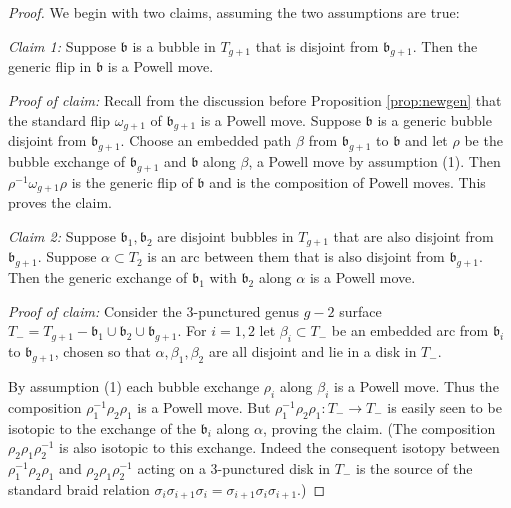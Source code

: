 \documentclass[12pt]{amsart}
\newcommand{\calG}{\mathcal G}
\newcommand{\frb}{\mathfrak{b}}
\begin{document}
\begin{proof}  We begin with two claims, assuming the two                             assumptions are true:
\medskip

{\em Claim 1:}  Suppose $\frb$ is a bubble in $T_{g+1}$ that is disjoint from $\frb_{g+1}$.  Then the generic flip in $\frb$ is a Powell move.  

{\em Proof of claim:}  Recall from the discussion before Proposition \ref{prop:newgen} that  the standard flip $\omega_{g+1}$ of $\frb_{g+1}$ is a Powell move.  Suppose $\frb$ is a generic bubble disjoint from $\frb_{g+1}$.  Choose an embedded path $\beta$ from $\frb_{g+1}$ to $\frb$ and let $\rho$ be the bubble exchange of $\frb_{g+1}$ and $\frb$ along $\beta$, a Powell move by assumption (1).  Then $\rho^{-1} \omega_{g+1} \rho$ is the generic flip of $\frb$ and is the composition of Powell moves. This proves the claim.
\medskip 

{\em Claim 2:}  Suppose $\frb_1, \frb_2$ are disjoint bubbles in $T_{g+1}$ that are also disjoint from $\frb_{g+1}$.  Suppose $\alpha \subset T_2$ is an arc between them that is also disjoint from $\frb_{g+1}$.  Then the generic exchange of $\frb_1$ with $\frb_2$ along $\alpha$
 is a Powell move.

{\em Proof of claim:}  %
Consider the 3-punctured genus $g-2$ surface $T_- = T_{g+1} - {\frb_1 \cup \frb_2 \cup \frb_{g+1}}$.  For $i = 1, 2$ let $\beta_i \subset T_-$ be an embedded arc from $\frb_i$ to $\frb_{g+1}$, chosen so that $\alpha, \beta_1, \beta_2$ are all disjoint and lie in a disk in $T_- $.  

By assumption (1) each bubble exchange $\rho_i$ along $\beta_i$ is a Powell move.  Thus the composition $\rho_1^{-1} \rho_2 \rho_1$ is a Powell move. But  $\rho_1^{-1} \rho_2 \rho_1:T_- \to T_-$ is easily seen to be isotopic to the exchange of the $\frb_i$ along $\alpha$, proving the claim.  (The composition $\rho_2 \rho_1 \rho_2^{-1}$ is also isotopic to this exchange. %
Indeed the consequent isotopy between  $\rho_1^{-1} \rho_2 \rho_1$ and $\rho_2 \rho_1 \rho_2^{-1}$ acting on a 3-punctured disk in $T_-$ is the source of the standard braid relation $\sigma_i \sigma_{i+1} \sigma_i = \sigma_{i+1} \sigma_i\sigma_{i+1}$.)
\medskip


\end{proof}
\end{document}
